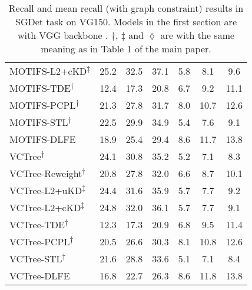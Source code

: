 \documentclass[sigconf]{acmart}
\begin{document}
\begin{table*}[htbp]
{\begin{tabular}{l |c c c c c c}
MOTIFS-L2+cKD\textsuperscript{$\ddagger$} \cite{DBLP:conf/bmvc/WangPL20} & 25.2 & 32.5 & 37.1 & 5.8 & 8.1 & 9.6 \\
MOTIFS-TDE\textsuperscript{$\dagger$} \cite{tang2020unbiased} & 12.4 & 17.3 & 20.8 & 6.7 & 9.2 & 11.1 \\
MOTIFS-PCPL\textsuperscript{$\dagger$} \cite{yan2020pcpl} & 21.3 & 27.8 & 31.7 & 8.0 & 10.7 & 12.6 \\
MOTIFS-STL\textsuperscript{$\dagger$} \cite{chen2019soft} & 22.5 & 29.9 & 34.9 & 5.4 & 7.6 & 9.1 \\
MOTIFS-DLFE & 18.9 & 25.4 & 29.4 & 8.6 & 11.7 & 13.8 \\
\hline
VCTree\textsuperscript{$\dagger$} \cite{tang2019learning,tang2020unbiased} & 24.1 & 30.8 & 35.2 & 5.2 & 7.1 & 8.3 \\
VCTree-Reweight\textsuperscript{$\dagger$} & 20.8 & 27.8 & 32.0 & 6.6 & 8.7 & 10.1\\
VCTree-L2+uKD\textsuperscript{$\ddagger$} \cite{DBLP:conf/bmvc/WangPL20} & 24.4 & 31.6 & 35.9 & 5.7 & 7.7 & 9.2 \\ 
VCTree-L2+cKD\textsuperscript{$\ddagger$} \cite{DBLP:conf/bmvc/WangPL20} & 24.8 & 32.0 & 36.1 & 5.7 & 7.7 & 9.1 \\ 
VCTree-TDE\textsuperscript{$\dagger$} \cite{tang2020unbiased} & 12.3 & 17.3 & 20.9 & 6.8 & 9.5 & 11.4 \\
VCTree-PCPL\textsuperscript{$\dagger$} \cite{yan2020pcpl} & 20.5 & 26.6 & 30.3 & 8.1 & 10.8 & 12.6 \\
VCTree-STL\textsuperscript{$\dagger$} \cite{chen2019soft} & 21.6 & 28.8 & 33.6 & 5.1 & 7.1 & 8.4 \\
VCTree-DLFE & 16.8 & 22.7 & 26.3 & 8.6 & 11.8 & 13.8 \\
\hline
\end{tabular}
}
\vspace{0.1em}
\caption{Recall and mean recall (with graph constraint) results in SGDet task on VG150. 
Models in the first section are with VGG backbone \cite{simonyan2014very}.
$\dagger$, $\ddagger$ and $\lozenge$ are with the same meaning as in Table 1 of the main paper.
}
\label{tab:sgg_result_sgdet}
\end{table*}
\end{document}
